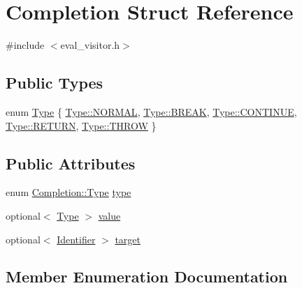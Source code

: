 \hypertarget{struct_completion}{}\section{Completion Struct Reference}
\label{struct_completion}


{\ttfamily \#include $<$eval\+\_\+visitor.\+h$>$}

\subsection*{Public Types}
\begin{DoxyCompactItemize}
\item 
enum \hyperlink{struct_completion_af7c4c541b6dc1c492a4e140f04fd66d9}{Type} \{ \newline
\hyperlink{struct_completion_af7c4c541b6dc1c492a4e140f04fd66d9a1e23852820b9154316c7c06e2b7ba051}{Type\+::\+N\+O\+R\+M\+AL}, 
\hyperlink{struct_completion_af7c4c541b6dc1c492a4e140f04fd66d9a14d6a3e0201f58bfe7c01e775973e80e}{Type\+::\+B\+R\+E\+AK}, 
\hyperlink{struct_completion_af7c4c541b6dc1c492a4e140f04fd66d9a2f453cfe638e57e27bb0c9512436111e}{Type\+::\+C\+O\+N\+T\+I\+N\+UE}, 
\hyperlink{struct_completion_af7c4c541b6dc1c492a4e140f04fd66d9aa2bec276a54439fe011eb523b845dac5}{Type\+::\+R\+E\+T\+U\+RN}, 
\newline
\hyperlink{struct_completion_af7c4c541b6dc1c492a4e140f04fd66d9a655474de4674aba7a436a73cd8d9a906}{Type\+::\+T\+H\+R\+OW}
 \}
\end{DoxyCompactItemize}
\subsection*{Public Attributes}
\begin{DoxyCompactItemize}
\item 
enum \hyperlink{struct_completion_af7c4c541b6dc1c492a4e140f04fd66d9}{Completion\+::\+Type} \hyperlink{struct_completion_a89320790d1fa2706f4bb85ad30673a9f}{type}
\item 
optional$<$ \hyperlink{struct_completion_af7c4c541b6dc1c492a4e140f04fd66d9}{Type} $>$ \hyperlink{struct_completion_a9cd2ab31c45bfa5a9acde9d033debbe1}{value}
\item 
optional$<$ \hyperlink{struct_identifier}{Identifier} $>$ \hyperlink{struct_completion_a6c68d7405ba6a7b2d508f936cbf0be5c}{target}
\end{DoxyCompactItemize}


\subsection{Member Enumeration Documentation}
\mbox{\label{struct_completion_af7c4c541b6dc1c492a4e140f04fd66d9}} 
